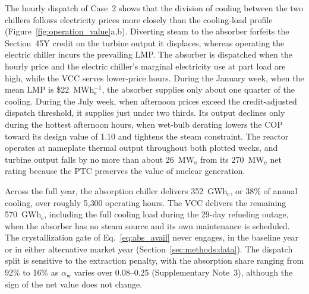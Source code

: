 \documentclass[a4paper,fleqn]{cas-sc}
\begin{document}
The hourly dispatch of Case~2 shows that the division of cooling between the two chillers follows electricity prices more closely than the cooling-load profile (Figure~\ref{fig:operation_value}a,b). Diverting steam to the absorber forfeits the Section~45Y credit on the turbine output it displaces, whereas operating the electric chiller incurs the prevailing LMP. The absorber is dispatched when the hourly price and the electric chiller's marginal electricity use at part load are high, while the VCC serves lower-price hours. During the January week, when the mean LMP is \$22~MWh$_\mathrm{e}^{-1}$, the absorber supplies only about one quarter of the cooling. During the July week, when afternoon prices exceed the credit-adjusted dispatch threshold, it supplies just under two thirds. Its output declines only during the hottest afternoon hours, when wet-bulb derating lowers the COP toward its design value of 1.10 and tightens the steam constraint. The reactor operates at nameplate thermal output throughout both plotted weeks, and turbine output falls by no more than about 26~MW$_\mathrm{e}$ from its 270~MW$_\mathrm{e}$ net rating because the PTC preserves the value of nuclear generation.

Across the full year, the absorption chiller delivers 352~GWh$_\mathrm{c}$, or 38\% of annual cooling, over roughly 5{,}300 operating hours. The VCC delivers the remaining 570~GWh$_\mathrm{c}$, including the full cooling load during the 29-day refueling outage, when the absorber has no steam source and its own maintenance is scheduled. The crystallization gate of Eq.~\eqref{eq:abs_avail} never engages, in the baseline year or in either alternative market year (Section~\ref{sec:methods:data}). The dispatch split is sensitive to the extraction penalty, with the absorption share ranging from 92\% to 16\% as $\alpha_\mathrm{w}$ varies over 0.08--0.25 (Supplementary Note~3), although the sign of the net value does not change.
\end{document}
